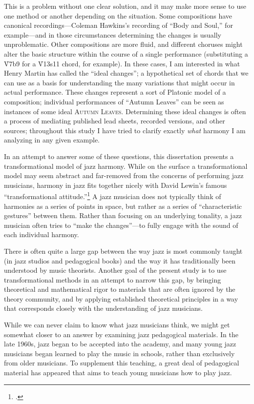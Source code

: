 This is a problem without one clear solution, and it may make more sense to
use one method or another depending on the situation. Some compositions have
canonical recordings---Coleman Hawkins’s recording of “Body and Soul,” for
example---and in those circumstances determining the changes is usually
unproblematic. Other compositions are more fluid, and different choruses might
alter the basic structure within the course of a single performance
(substituting a \h{V7b9} for a \h{V13s11} chord, for example). In these
cases, I am interested in what Henry Martin has called the “ideal changes”; a
hypothetical set of chords that we can use as a basis for understanding the
many variations that might occur in actual performance. These
changes represent a sort of Platonic model of a composition; individual
performances of “Autumn Leaves” can be seen as instances of some ideal
\textsc{Autumn Leaves}. Determining these ideal changes is often a process
of mediating published lead sheets, recorded versions, and other sources;
throughout this study I have tried to clarify exactly \emph{what} harmony I am
analyzing in any given example.

In an attempt to answer some of these questions, this dissertation presents a
transformational model of jazz harmony. While on the surface a
transformational model may seem abstract and far-removed from the concerns of
performing jazz musicians, harmony in jazz fits together nicely with David
Lewin’s famous “transformational attitude.”\footcite[][159 (hereafter
\emph{GMIT)}]{lewin:gmit} A jazz
musician does not typically think of harmonies as a series of points in space,
but rather as a series of “characteristic gestures” between them. Rather than
focusing on an underlying tonality, a jazz musician often tries to “make the
changes”---to fully engage with the sound of each individual harmony.

There is often quite a large gap between the way jazz is most commonly taught
(in jazz studios and pedagogical books) and the way it has traditionally been
understood by music theorists. Another goal of the present study is to use
transformational methods in an attempt to narrow this gap, by bringing
theoretical and mathematical rigor to materials that are often ignored by the
theory community, and by applying established theoretical principles in a way
that corresponds closely with the understanding of jazz musicians.

While we can never claim to know what jazz musicians think, we might get
somewhat closer to an answer by examining jazz pedagogical materials. In the
late 1960s, jazz began to be accepted into the academy, and many young jazz
musicians began learned to play the music in schools, rather than exclusively
from older musicians. To supplement this teaching, a great deal of
pedagogical material has appeared that aims to teach young musicians how to
play jazz.

